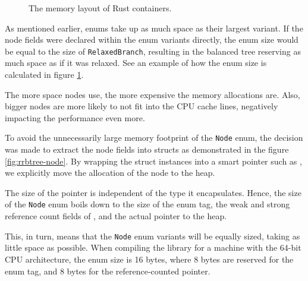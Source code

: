 \begin{figure}[H]

    \caption{The memory layout of Rust containers.}
    \label{fig:memory-layout-of-rust-containers}
\end{figure}

As mentioned earlier, enums take up as much space as their largest variant. If the node fields were declared within the enum variants directly, the enum size would be equal to the size of \texttt{RelaxedBranch}, resulting in the balanced tree reserving as much space as if it was relaxed. See an example of how the enum size is calculated in figure \ref{fig:memory-layout-of-rust-containers}.

The more space nodes use, the more expensive the memory allocations are. Also, bigger nodes are more likely to not fit into the CPU cache lines, negatively impacting the performance even more.

To avoid the unnecessarily large memory footprint of the \texttt{Node} enum, the decision was made to extract the node fields into structs as demonstrated in the figure \ref{fig:rrbtree-node}. By wrapping the struct instances into a smart pointer such as \rc{}, we explicitly move the allocation of the node to the heap.

The size of the \rc{} pointer is independent of the type it encapsulates. Hence, the size of the \texttt{Node} enum boils down to the size of the enum tag, the weak and strong reference count fields of \rc{}, and the actual pointer to the heap.

This, in turn, means that the \texttt{Node} enum variants will be equally sized, taking as little space as possible. When compiling the library for a machine with the 64-bit CPU architecture, the enum size is 16 bytes, where 8 bytes are reserved for the enum tag, and 8 bytes for the reference-counted pointer.

